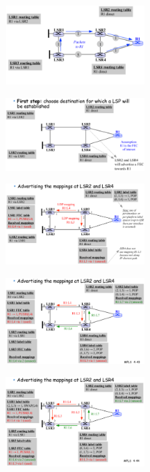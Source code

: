\documentclass{article}
\begin{document}
\begin{sffamily}
    \begin{center}
    \includegraphics[width=200px]{img_013.pdf}
    \end{center}	

    \begin{center}
    \includegraphics[width=200px]{img_014.pdf}
    \end{center}	

    \begin{center}
    \includegraphics[width=200px]{img_015.pdf}
    \end{center}	

    \begin{center}
    \includegraphics[width=200px]{img_016.pdf}
    \end{center}	

    \begin{center}
    \includegraphics[width=200px]{img_017.pdf}
    \end{center}	


\end{sffamily}
\end{document}
